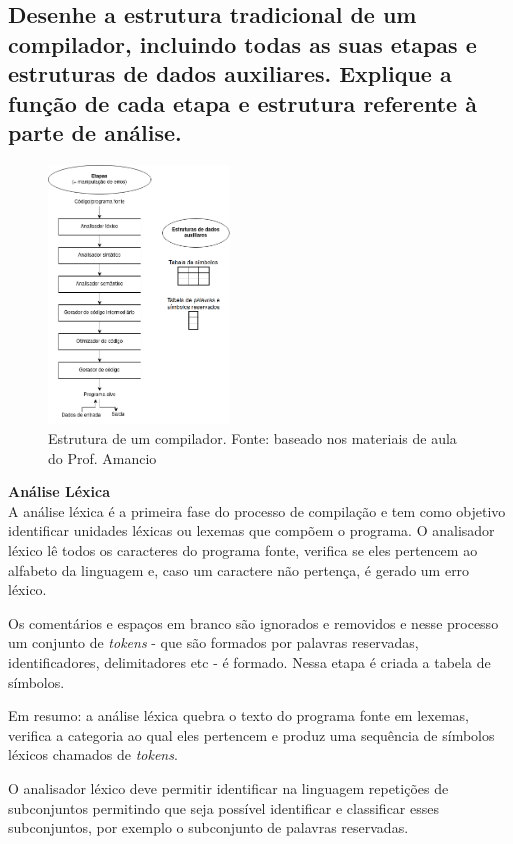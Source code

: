 \documentclass{article}
\begin{document}
\subsection{Desenhe a estrutura tradicional de um compilador, incluindo todas as suas etapas e estruturas
de dados auxiliares. Explique a função de cada etapa e estrutura referente à parte de análise.}

\begin{figure}[ht!]
    \centering
    \includegraphics[width=0.43\textwidth]{p1/etapas.png}
    \caption{Estrutura de um compilador. Fonte: baseado nos materiais de aula do Prof. Amancio}
\end{figure}

\textbf{Análise Léxica}
\\

A análise léxica é a primeira fase do processo de compilação e tem como objetivo identificar unidades léxicas ou lexemas que compõem o programa. O analisador léxico lê todos os caracteres do programa fonte, verifica se eles pertencem ao alfabeto da linguagem e, caso um caractere não pertença, é gerado um erro léxico.

Os comentários e espaços em branco são ignorados e removidos e nesse processo um conjunto de \textit{tokens} - que são formados por palavras reservadas, identificadores, delimitadores etc - é formado. Nessa etapa é criada a tabela de símbolos.

Em resumo: a análise léxica quebra o texto do programa fonte em lexemas, verifica a categoria ao qual eles pertencem e produz uma sequência de símbolos léxicos chamados de \textit{tokens}.

O analisador léxico deve permitir identificar na linguagem repetições de subconjuntos permitindo que seja possível identificar e classificar esses subconjuntos, por exemplo o subconjunto de palavras reservadas.
\end{document}
